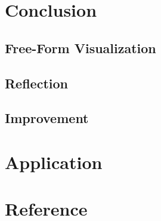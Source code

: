 \documentclass[12pt,a4paper]{article}
\theoremstyle{definition}
\begin{document}
\section{Conclusion}
\subsection{Free-Form Visualization}
\subsection{Reflection}
\subsection{Improvement}

\section{Application}

\section{Reference}

\end{document}
